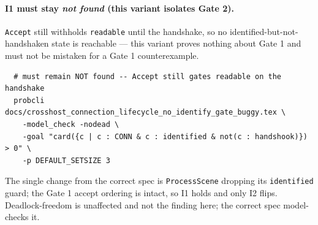 \documentclass[a4paper,10pt,fleqn]{article}
\begin{document}
\paragraph{I1 must stay \emph{not found} (this variant isolates Gate 2).}
\texttt{Accept} still withholds \texttt{readable} until the handshake, so no
identified-but-not-handshaken state is reachable --- this variant proves
nothing about Gate 1 and must not be mistaken for a Gate 1 counterexample.
\begin{verbatim}
  # must remain NOT found -- Accept still gates readable on the handshake
  probcli docs/crosshost_connection_lifecycle_no_identify_gate_buggy.tex \
    -model_check -nodead \
    -goal "card({c | c : CONN & c : identified & not(c : handshook)}) > 0" \
    -p DEFAULT_SETSIZE 3
\end{verbatim}

The single change from the correct spec is \texttt{ProcessScene} dropping
its \texttt{identified} guard; the Gate 1 accept ordering is intact, so I1
holds and only I2 flips.  Deadlock-freedom is unaffected and not the
finding here; the correct spec model-checks it.
\end{document}
